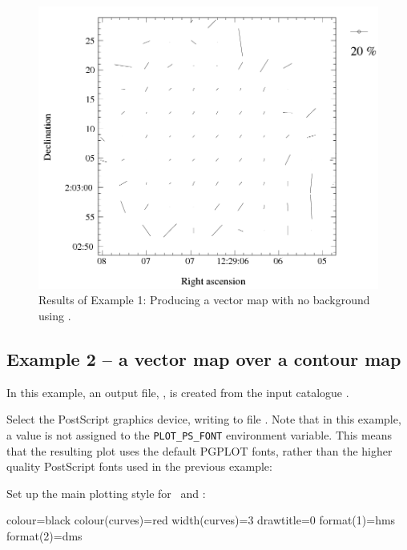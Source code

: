 \begin{figure}[t!]
\begin{center}
\includegraphics[width=0.75\linewidth]{sc22-kappa-plots-plot1.png}
\caption [Vector map with polplot]{ Results of Example 1: Producing a
  vector map with no background using .}
\label{fig:kappa-plot1}
\end{center}
\end{figure}

\subsection{ Example 2 -- a vector map over a contour map}
\label{section:kappa-example2}


In this example, an output file, , is created from the input
catalogue .

Select the PostScript graphics device, writing to file .
Note that in this example, a value is not assigned to the \texttt{PLOT\_PS\_FONT}
environment variable. This means that the resulting plot uses the default PGPLOT
fonts, rather than the higher quality PostScript fonts used in the previous
example:

\begin{terminalv}
\end{terminalv}

Set up the main plotting style for \contour\ and :

\begin{terminalv}
colour=black
colour(curves)=red
width(curves)=3
drawtitle=0
format(1)=hms
format(2)=dms
\end{terminalv}


